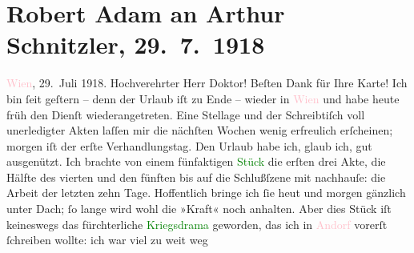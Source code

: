 

               \section[Robert Adam an Arthur Schnitzler, 29. 7. 1918]{ Robert Adam an Arthur Schnitzler, 29. 7. 1918}\nopagebreak{}\rehead{ }\normalsize\beginnumbering{} \toendnotes[C]{\smallbreak\pagebreak[2]} 
\toendnotes[C]{\smallbreak}\pstart
           \raggedleft{}{\pb}\textcolor{pink}{Wien}{}\ledrightnote{\textcolor{pink}{Wien}}, 29. Juli 1918.\pend
           \pstart\center{}Hochverehrter Herr Doktor!\pend\pstart
           Beſten Dank für Ihre Karte!\pend
           \pstart
           Ich bin ſeit geſtern – denn der Urlaub iſt zu Ende – wieder in \textcolor{pink}{Wien}{}\ledrightnote{\textcolor{pink}{Wien}} und habe heute früh den Dienſt wiederangetreten. Eine
                    Stellage und der Schreibtiſch voll unerledigter Akten laſſen mir die nächſten
                    Wochen wenig erfreulich erſcheinen; morgen iſt der erſte Verhandlungstag.\pend
           \pstart
           Den Urlaub habe ich, glaub ich, gut ausgenützt. Ich brachte von einem fünfaktigen
                        \textcolor{green}{Stück}{} die erſten drei
                    Akte, die Hälfte des vierten und den fünften bis auf die Schlußſzene mit
                    nachhauſe: die Arbeit der letzten zehn Tage. Hoffentlich bringe ich ſie heut und
                    morgen gänzlich unter Dach; ſo lange wird wohl die {\pb}»Kraft« noch anhalten. Aber dies
                    Stück iſt keineswegs das fürchterliche \textcolor{green}{Kriegsdrama}{} geworden, das ich in \textcolor{pink}{Andorf}{}\ledrightnote{\textcolor{pink}{Andorf}} vorerſt ſchreiben wollte: ich war viel zu weit weg
